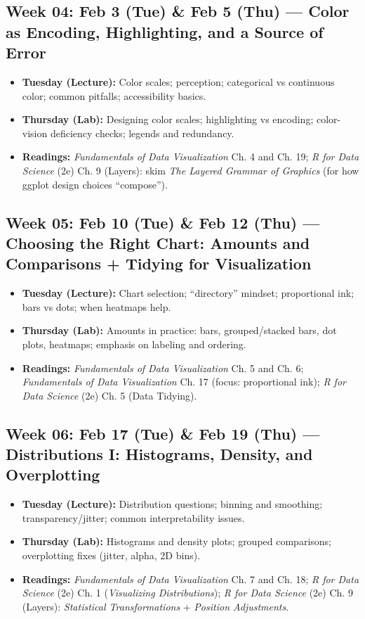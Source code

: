 \documentclass[letterpaper,11pt]{article}
\newcommand{\FDV}{\emph{Fundamentals of Data Visualization}}
\newcommand{\RDS}{\emph{R for Data Science} (2e)}
\newcommand{\compresslist}{
\setlength{\itemsep}{1pt}
\setlength{\parskip}{0pt}
\setlength{\parsep}{0pt}
}
\begin{document}
\subsection*{Week 04: Feb 3 (Tue) \& Feb 5 (Thu) --- Color as Encoding, Highlighting, and a Source of Error}
\begin{itemize}\compresslist
\item \textbf{Tuesday (Lecture):} Color scales; perception; categorical vs continuous color; common pitfalls; accessibility basics.
\item \textbf{Thursday (Lab):} Designing color scales; highlighting vs encoding; color-vision deficiency checks; legends and redundancy.
\item \textbf{Readings:} \FDV{} Ch. 4 and Ch. 19; \RDS{} Ch. 9 (Layers): skim \emph{The Layered Grammar of Graphics} (for how ggplot design choices ``compose'').
\end{itemize}

\subsection*{Week 05: Feb 10 (Tue) \& Feb 12 (Thu) --- Choosing the Right Chart: Amounts and Comparisons + Tidying for Visualization}
\begin{itemize}\compresslist
\item \textbf{Tuesday (Lecture):} Chart selection; ``directory'' mindset; proportional ink; bars vs dots; when heatmaps help.
\item \textbf{Thursday (Lab):} Amounts in practice: bars, grouped/stacked bars, dot plots, heatmaps; emphasis on labeling and ordering.
\item \textbf{Readings:} \FDV{} Ch. 5 and Ch. 6; \FDV{} Ch. 17 (focus: proportional ink); \RDS{} Ch. 5 (Data Tidying).
\end{itemize}

\subsection*{Week 06: Feb 17 (Tue) \& Feb 19 (Thu) --- Distributions I: Histograms, Density, and Overplotting}
\begin{itemize}\compresslist
\item \textbf{Tuesday (Lecture):} Distribution questions; binning and smoothing; transparency/jitter; common interpretability issues.
\item \textbf{Thursday (Lab):} Histograms and density plots; grouped comparisons; overplotting fixes (jitter, alpha, 2D bins).
\item \textbf{Readings:} \FDV{} Ch. 7 and Ch. 18; \RDS{} Ch. 1 (\emph{Visualizing Distributions}); \RDS{} Ch. 9 (Layers): \emph{Statistical Transformations} + \emph{Position Adjustments}.
\end{itemize}
\end{document}
